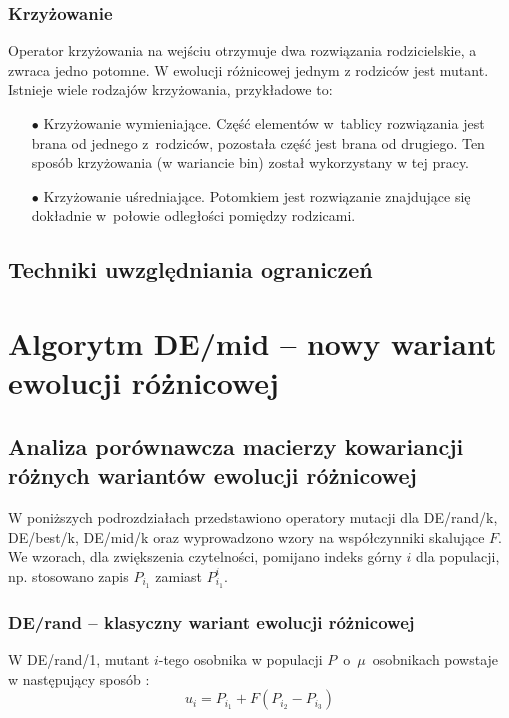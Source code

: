 \documentclass[a4paper,onecolumn,oneside,12pt,wide,floatssmall]{mwrep}
\theoremstyle{definition}
\theoremstyle{plain}%
\theoremstyle{remark}
\begin{document}
\subsection{Krzyżowanie}

Operator krzyżowania na wejściu otrzymuje dwa rozwiązania rodzicielskie, a zwraca jedno potomne. 
W ewolucji różnicowej jednym z rodziców jest mutant. Istnieje wiele rodzajów krzyżowania, 
przykładowe to:
\begin{itemize} 
 \item[$\bullet$]  Krzyżowanie wymieniające. 
Część elementów w tablicy rozwiązania jest brana od jednego z rodziców, 
pozostała część jest brana od drugiego. Ten sposób krzyżowania (w wariancie bin)
został wykorzystany w tej pracy.
 \item[$\bullet$] Krzyżowanie uśredniające. 
Potomkiem jest rozwiązanie znajdujące się dokładnie w~połowie odległości pomiędzy rodzicami.
\end{itemize} 

\section{Techniki uwzględniania ograniczeń}

\chapter{Algorytm DE/mid -- nowy wariant ewolucji różnicowej}

\section{Analiza porównawcza macierzy kowariancji różnych wariantów ewolucji różnicowej}

W poniższych podrozdziałach przedstawiono operatory mutacji dla DE/rand/k, DE/best/k, DE/mid/k 
oraz wyprowadzono wzory na współczynniki skalujące $F$. We wzorach, dla zwiększenia
czytelności, pomijano indeks górny $i$ dla populacji, np. stosowano zapis $P_{i_1}$ 
zamiast $P_{i_1}^i$.

\subsection{DE/rand -- klasyczny wariant ewolucji różnicowej}
\label{chap:de_rand} 

W DE/rand/1, mutant $i$-tego osobnika w populacji $P$~o~$\mu$~osobnikach powstaje w następujący sposób 
\cite{decomposition}:
\begin{equation} \label{eq:derand1}
u_i = P_{i_1} + F(P_{i_2} - P_{i_3})
\end{equation}
\end{document}
